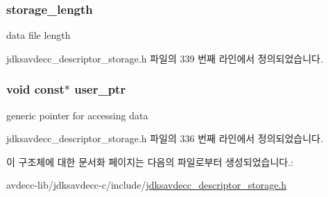 \subsubsection[{\texorpdfstring{storage\+\_\+length}{storage_length}}]{ storage\+\_\+length}\hypertarget{structjdksavdecc__descriptor__storage_a4c901ad7e199ca61d6cdadd2fce52b83}{}\label{structjdksavdecc__descriptor__storage_a4c901ad7e199ca61d6cdadd2fce52b83}
data file length 

jdksavdecc\+\_\+descriptor\+\_\+storage.\+h 파일의 339 번째 라인에서 정의되었습니다.

\subsubsection[{\texorpdfstring{user\+\_\+ptr}{user_ptr}}]{\setlength{\rightskip}{0pt plus 5cm}void const$\ast$ user\+\_\+ptr}\hypertarget{structjdksavdecc__descriptor__storage_a7b014caab0b5b593d13d50f3510afbfb}{}\label{structjdksavdecc__descriptor__storage_a7b014caab0b5b593d13d50f3510afbfb}
generic pointer for accessing data 

jdksavdecc\+\_\+descriptor\+\_\+storage.\+h 파일의 336 번째 라인에서 정의되었습니다.



이 구조체에 대한 문서화 페이지는 다음의 파일로부터 생성되었습니다.\+:\begin{DoxyCompactItemize}
\item 
avdecc-\/lib/jdksavdecc-\/c/include/\hyperlink{jdksavdecc__descriptor__storage_8h}{jdksavdecc\+\_\+descriptor\+\_\+storage.\+h}\end{DoxyCompactItemize}
